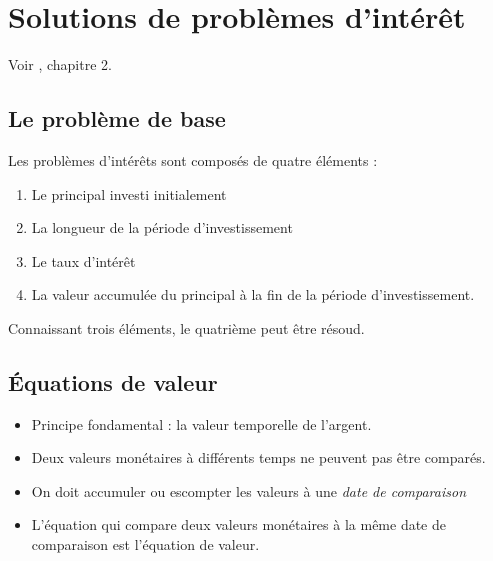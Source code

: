 \chapter{Solutions de problèmes d'intérêt}

Voir \cite{kellison2006theory}, chapitre 2.

\section{Le problème de base}

Les problèmes d'intérêts sont composés de quatre éléments : 
\begin{enumerate}
	\item Le principal investi initialement
	\item La longueur de la période d'investissement
	\item Le taux d'intérêt
	\item La valeur accumulée du principal à la fin de la période d'investissement.
\end{enumerate}
Connaissant trois éléments, le quatrième peut être résoud.

\section{Équations de valeur}

\begin{itemize}
	\item Principe fondamental : la valeur temporelle de l'argent. 
	\item Deux valeurs monétaires à différents temps ne peuvent pas être comparés. 
	\item On doit accumuler ou escompter les valeurs à une \textit{date de comparaison}
	\item L'équation qui compare deux valeurs monétaires à la même date de comparaison est l'équation de valeur. 
\end{itemize}